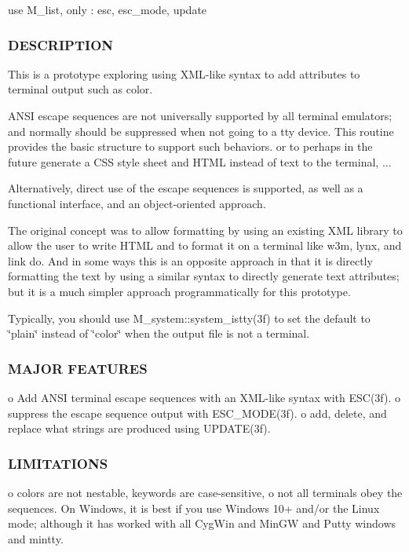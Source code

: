 \begin{DoxyVerb} use M_list, only : esc, esc_mode, update
\end{DoxyVerb}


\subsubsection*{D\+E\+S\+C\+R\+I\+P\+T\+I\+ON}

This is a prototype exploring using X\+M\+L-\/like syntax to add attributes to terminal output such as color.

A\+N\+SI escape sequences are not universally supported by all terminal emulators; and normally should be suppressed when not going to a tty device. This routine provides the basic structure to support such behaviors. or to perhaps in the future generate a C\+SS style sheet and H\+T\+ML instead of text to the terminal, ...

Alternatively, direct use of the escape sequences is supported, as well as a functional interface, and an object-\/oriented approach.

The original concept was to allow formatting by using an existing X\+ML library to allow the user to write H\+T\+ML and to format it on a terminal like w3m, lynx, and link do. And in some ways this is an opposite approach in that it is directly formatting the text by using a similar syntax to directly generate text attributes; but it is a much simpler approach programmatically for this prototype.

Typically, you should use M\+\_\+system\+::system\+\_\+istty(3f) to set the default to \char`\"{}plain\char`\"{} instead of \char`\"{}color\char`\"{} when the output file is not a terminal.

\subsubsection*{M\+A\+J\+OR F\+E\+A\+T\+U\+R\+ES}

o Add A\+N\+SI terminal escape sequences with an X\+M\+L-\/like syntax with E\+S\+C(3f). o suppress the escape sequence output with E\+S\+C\+\_\+\+M\+O\+D\+E(3f). o add, delete, and replace what strings are produced using U\+P\+D\+A\+T\+E(3f).

\subsubsection*{L\+I\+M\+I\+T\+A\+T\+I\+O\+NS}

o colors are not nestable, keywords are case-\/sensitive, o not all terminals obey the sequences. On Windows, it is best if you use Windows 10+ and/or the Linux mode; although it has worked with all Cyg\+Win and Min\+GW and Putty windows and mintty.

